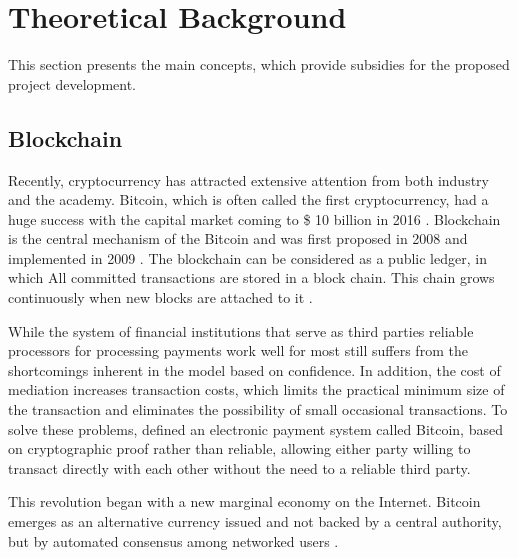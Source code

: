 \section{Theoretical Background} \label{sec:Theoretical}
This section presents the main concepts, which provide subsidies for the proposed project development.


%
%
% 
%

\subsection{Blockchain}\label{sec:blockchain}
Recently, cryptocurrency has attracted extensive attention from both industry and the academy. Bitcoin, which is often called the first cryptocurrency, had a huge success with the capital market coming to \$ 10 billion in 2016 \cite{coindesk}. Blockchain is the central mechanism of the Bitcoin and was first proposed in 2008 and implemented in 2009 \cite{nakamoto2008bitcoin}. The blockchain can be considered as a public ledger, in which All committed transactions are stored in a block chain. This chain grows continuously when new blocks are attached to it \cite{zheng2016blockchain}.

While the system of financial institutions that serve as third parties reliable processors for processing payments work well for most still suffers from the shortcomings inherent in the model based on confidence. In addition, the cost of mediation increases transaction costs, which limits the practical minimum size of the transaction and eliminates the possibility of small occasional transactions. To solve these problems, \cite{nakamoto2008bitcoin} defined an electronic payment system called Bitcoin, based on cryptographic proof rather than reliable, allowing either party willing to transact directly with each other without the need to a reliable third party.

This revolution began with a new marginal economy on the Internet. Bitcoin emerges as an alternative currency issued and not backed by a central authority, but by automated consensus among networked users \cite{swan2015blockchain}.

